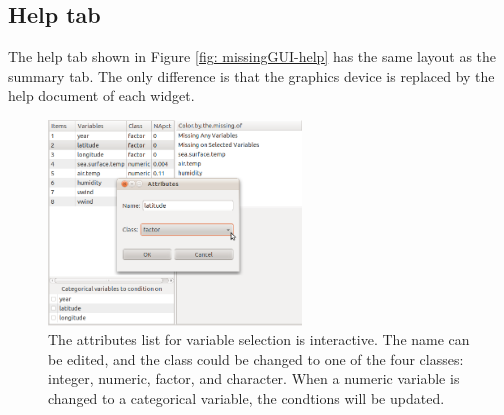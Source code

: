 \documentclass[english]{article}
\begin{document}
\subsection{Help tab}

The help tab shown in Figure \ref{fig: missingGUI-help} has the same layout as the summary tab. The only difference is that the graphics device is replaced by the help document of each widget.

\begin{center}
%
\begin{figure}[h]
\begin{centering}
\includegraphics[width=0.6\textwidth]{Miss_fig8}
\par\end{centering}

\caption{The attributes list for variable selection is interactive. The name can be edited, and the class could be changed to one of the four classes: integer, numeric, factor, and character. When a numeric variable is changed to a categorical variable, the condtions will be updated.}
\label{fig: attributes}
\end{figure}

\par\end{center}
\end{document}
